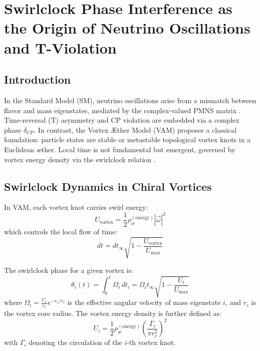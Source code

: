 \section{Swirlclock Phase Interference as the Origin of Neutrino Oscillations and T-Violation}

\subsection{Introduction}

In the Standard Model (SM), neutrino oscillations arise from a mismatch between flavor and mass eigenstates, mediated by the complex-valued PMNS matrix \cite{pontecorvo1957inverse, mns1962neutrino}. Time-reversal (T) asymmetry and CP violation are embedded via a complex phase \( \delta_{CP} \). In contrast, the Vortex \AE ther Model (VAM) proposes a classical foundation: particle states are stable or metastable topological vortex knots in a Euclidean \ae ther. Local time is not fundamental but emergent, governed by vortex energy density via the swirlclock relation \cite{iskandarani2025vam2}.

\subsection{Swirlclock Dynamics in Chiral Vortices}

In VAM, each vortex knot carries swirl energy:
\begin{equation}
U_\text{vortex} = \frac{1}{2} \rho_\text{\ae}^{(\text{energy})} |\vec{\omega}|^2
\end{equation}
which controls the local flow of time:
\begin{equation}
dt = dt_\infty \sqrt{1 - \frac{U_\text{vortex}}{U_\text{max}}}
\end{equation}

The swirlclock phase for a given vortex is:
\begin{equation}
\theta_i(t) = \int_0^t \Omega_i \, dt_i = \Omega_i t_\infty \sqrt{1 - \frac{U_i}{U_\text{max}}}
\end{equation}
where \( \Omega_i = \frac{C_e}{r_c} e^{-r_i/r_c} \) is the effective angular velocity of mass eigenstate \( i \), and \( r_c \) is the vortex core radius. The vortex energy density is further defined as:
\begin{equation}
U_i = \frac{1}{2} \rho_\text{\ae}^{(\text{energy})} \left( \frac{\Gamma_i}{\pi r_c^2} \right)^2
\end{equation}
with \( \Gamma_i \) denoting the circulation of the \( i \)-th vortex knot.

